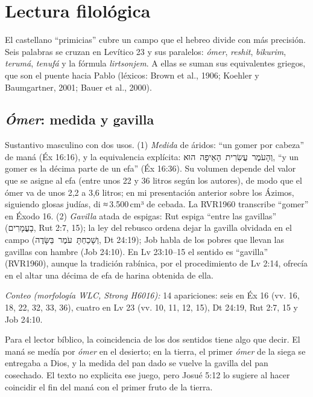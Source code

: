 \documentclass[11pt,letterpaper]{article}
\newcommand{\heb}[1]{\mbox{\foreignlanguage{hebrew}{#1}}}
\begin{document}
\section{Lectura filológica}

El castellano ``primicias'' cubre un campo que el hebreo divide con más precisión. Seis palabras se cruzan en Levítico 23 y sus paralelos: \emph{ómer}, \emph{reshit}, \emph{bikurim}, \emph{terumá}, \emph{tenufá} y la fórmula \emph{lirtsonjem}. A ellas se suman sus equivalentes griegos, que son el puente hacia Pablo (léxicos: Brown et al., 1906; Koehler y Baumgartner, 2001; Bauer et al., 2000).

\subsection{\emph{Ómer}: medida y gavilla}

\begin{filologia}[\heb{עֹמֶר} (\emph{ómer})]
Sustantivo masculino con dos usos. (1) \emph{Medida} de áridos: ``un gomer por cabeza'' de maná (Éx 16:16), y la equivalencia explícita: \heb{וְהָעֹמֶר עֲשִׂרִית הָאֵיפָה הוּא}, ``y un gomer es la décima parte de un efa'' (Éx 16:36). Su volumen depende del valor que se asigne al efa (entre unos 22 y 36 litros según los autores), de modo que el ómer va de unos 2,2 a 3,6 litros; en mi presentación anterior sobre los Ázimos, siguiendo glosas judías, di ≈\,3.500\,cm³ de cebada. La RVR1960 transcribe ``gomer'' en Éxodo 16. (2) \emph{Gavilla} atada de espigas: Rut espiga ``entre las gavillas'' (\heb{בָעֳמָרִים}, Rut 2:7, 15); la ley del rebusco ordena dejar la gavilla olvidada en el campo (\heb{וְשָׁכַחְתָּ עֹמֶר בַּשָּׂדֶה}, Dt 24:19); Job habla de los pobres que llevan las gavillas con hambre (Job 24:10). En Lv 23:10--15 el sentido es ``gavilla'' (RVR1960), aunque la tradición rabínica, por el procedimiento de Lv 2:14, ofrecía en el altar una décima de efa de harina obtenida de ella.
\par\smallskip\emph{Conteo (morfología WLC, Strong H6016):} 14 apariciones: seis en Éx 16 (vv. 16, 18, 22, 32, 33, 36), cuatro en Lv 23 (vv. 10, 11, 12, 15), Dt 24:19, Rut 2:7, 15 y Job 24:10.
\end{filologia}

Para el lector bíblico, la coincidencia de los dos sentidos tiene algo que decir. El maná se medía por \emph{ómer} en el desierto; en la tierra, el primer \emph{ómer} de la siega se entregaba a Dios, y la medida del pan dado se vuelve la gavilla del pan cosechado. El texto no explicita ese juego, pero Josué 5:12 lo sugiere al hacer coincidir el fin del maná con el primer fruto de la tierra.
\end{document}
